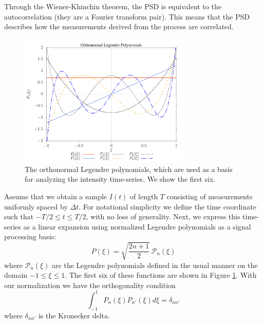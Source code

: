 \documentclass[10pt,preprint]{aastex631}
\begin{document}
Through the Wiener-Khinchin theorem, the PSD is equivalent to the autocorrelation (they are a Fourier transform pair).  This means that the PSD describes how the measurements derived from the process are correlated. 

\begin{figure}[h]
\centering
\includegraphics[width=3.25in]{onLegPol.pdf}
\caption{The orthonormal Legendre polynomials, which are used as a basis for analyzing the intensity time-series.  We show the first six. \label{fig:onlegpol}}
\end{figure}

Assume that we obtain a sample $I(t)$ of length $T$ consisting of measurements uniformly spaced by $\Delta t$.  For notational simplicity we define the time coordinate such that $-T/2 \le t \le T/2$, with no loss of generality.  Next, we express this time-series as a linear expansion using normalized Legendre polynomials as a signal processing basis:
\begin{equation}
P(\xi) = \sqrt{\frac{2n+1}{2}}\, \mathscr{P}_n(\xi)
\label{eqn:basis}
\end{equation}
where $\mathscr{P}_n(\xi)$ are the Legendre polynomials defined in the usual manner \citep[cf.][]{Olver:2010:NHMF} on the domain $-1 \le \xi \le 1$. The first six of these functions are shown in Figure \ref{fig:onlegpol}.  With our normalization we have the orthogonality condition
\begin{equation}
\int_{-1}^{1}P_n(\xi)P_{n'}(\xi) d\xi = \delta_{nn'}
\label{eqn:orthonormal}
\end{equation}
where $\delta_{nn'}$ is the Kronecker delta. 
\end{document}
